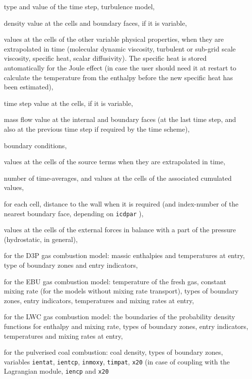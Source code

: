 {{{{\begin{list}{-}{}
\item type and value of the time step, turbulence model,
\item density value at the cells and boundary faces, if it is variable,
\item values at the cells of the other variable physical properties,
when they are extrapolated in time (molecular dynamic viscosity, turbulent or
sub-grid scale viscosity, specific heat, scalar diffusivity). The specific heat is stored automatically for the Joule
effect (in case the user should need
it at restart to calculate the temperature from the enthalpy before the new
specific heat has been estimated),
\item time step value at the cells, if it is variable,
\item mass flow value at the internal and boundary faces (at the last
time step, and also at the previous time step if required by the time scheme),
\item boundary conditions,
\item values at the cells of the source terms when they are extrapolated in time,
\item number of time-averages, and values at the cells of the associated
cumulated values,
\item for each cell, distance to the wall when it is required (and
index-number of the nearest boundary face, depending on \texttt{icdpar}%
),
\item values at the cells of the external forces in balance with a part
of the pressure (hydrostatic, in general),
\item for the D3P gas combustion model: massic enthalpies and temperatures at entry,
type of boundary zones and entry indicators,
\item for the EBU gas combustion model: temperature of the fresh gas, constant
mixing rate (for the models without mixing rate transport), types of boundary
zones, entry indicators, temperatures and mixing rates at entry,
\item for the LWC gas combustion model: the boundaries of the probability
density functions for enthalpy and mixing rate, types of boundary
zones, entry indicators, temperatures and mixing rates at entry,
\item for the pulverised coal combustion: coal density,  types of boundary
zones, variables \texttt{ientat}, \texttt{ientcp}, \texttt{inmoxy}, \texttt{timpat}, \texttt{x20}
(in case of coupling with the Lagrangian module, \texttt{iencp} and \texttt{x20}

\end{list}}}}}
